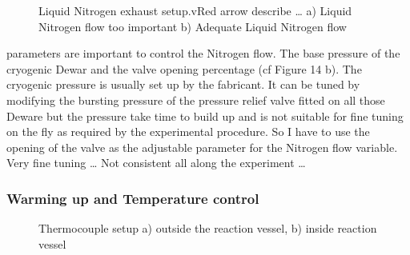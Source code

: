 \documentclass[letterpaper,10pt,english]{jupyterBook}
\begin{document}
\begin{figure}[htbp]
\centering
\capstart

\noindent{}
\caption{Liquid Nitrogen exhaust setup.vRed arrow describe …  a) Liquid Nitrogen flow too important b) Adequate Liquid Nitrogen flow}\label{\detokenize{Chapter7/Chapter7:id2}}\end{figure}

 parameters are important to control the Nitrogen flow. The base pressure of the cryogenic Dewar and the valve opening percentage (cf Figure 14 b). The cryogenic pressure is usually set up by the fabricant. It can be tuned by modifying the bursting pressure of the pressure relief valve fitted on all those Deware but the pressure take time to build up and is not suitable for fine tuning on the fly as required by the experimental procedure.
So I have to use the opening of the valve as the adjustable parameter for the Nitrogen flow variable. Very fine tuning … Not consistent all along the experiment …


\subsubsection{Warming up and Temperature control}
\label{\detokenize{Chapter7/Chapter7:warming-up-and-temperature-control}}
\begin{figure}[htbp]
\centering
\capstart

\noindent{}
\caption{Thermocouple setup a) outside the reaction vessel, b) inside reaction vessel}\label{\detokenize{Chapter7/Chapter7:id3}}\end{figure}
\end{document}
